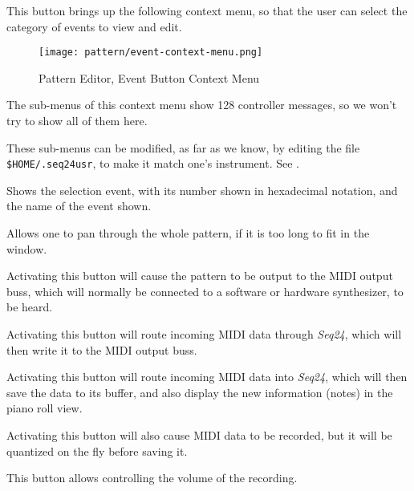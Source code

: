    \setcounter{ItemCounter}{0}      %

   This button brings up the following context menu, so that the user can
   select the category of events to view and edit.

\begin{figure}[H]
   \centering 
   \texttt{[image: pattern/event-context-menu.png]}
   \caption{Pattern Editor, Event Button Context Menu}
   \label{fig:pattern_editor_bottom_event_context_menu}
\end{figure}

   The sub-menus of this context menu show 128 controller messages,
   so we won't try to show all of them here.

   These sub-menus can be modified, as far as we know, by editing
   the file \texttt{\$HOME/.seq24usr}, to make it match one's instrument.
   See .

   Shows the selection event, with its number shown in hexadecimal notation,
   and the name of the event shown.

   Allows one to pan through the whole pattern, if it is too long to fit in
   the window.

   Activating this button will cause the pattern to be output to the MIDI
   output buss, which will normally be connected to a software or hardware
   synthesizer, to be heard.

   Activating this button will route incoming MIDI data through
   \textsl{Seq24}, which will then write it to the MIDI output buss.

   Activating this button will route incoming MIDI data into
   \textsl{Seq24}, which will then save the data to its buffer, and also
   display the new information (notes) in the piano roll view.

   Activating this button will also cause MIDI data to be recorded, but it
   will be quantized on the fly before saving it.

   This button allows controlling the volume of the recording.

